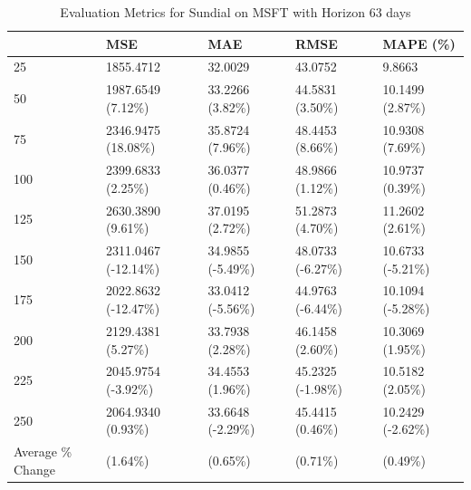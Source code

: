 \begin{table}
\caption{Evaluation Metrics for Sundial on MSFT with Horizon 63 days}
\label{tab:sundial_MSFT_h63_metrics}
\begin{tabular}{lllll}
\toprule
 & MSE & MAE & RMSE & MAPE (\%) \\
\midrule
25 & 1855.4712 & 32.0029 & 43.0752 & 9.8663 \\
50 & 1987.6549 (7.12\%) & 33.2266 (3.82\%) & 44.5831 (3.50\%) & 10.1499 (2.87\%) \\
75 & 2346.9475 (18.08\%) & 35.8724 (7.96\%) & 48.4453 (8.66\%) & 10.9308 (7.69\%) \\
100 & 2399.6833 (2.25\%) & 36.0377 (0.46\%) & 48.9866 (1.12\%) & 10.9737 (0.39\%) \\
125 & 2630.3890 (9.61\%) & 37.0195 (2.72\%) & 51.2873 (4.70\%) & 11.2602 (2.61\%) \\
150 & 2311.0467 (-12.14\%) & 34.9855 (-5.49\%) & 48.0733 (-6.27\%) & 10.6733 (-5.21\%) \\
175 & 2022.8632 (-12.47\%) & 33.0412 (-5.56\%) & 44.9763 (-6.44\%) & 10.1094 (-5.28\%) \\
200 & 2129.4381 (5.27\%) & 33.7938 (2.28\%) & 46.1458 (2.60\%) & 10.3069 (1.95\%) \\
225 & 2045.9754 (-3.92\%) & 34.4553 (1.96\%) & 45.2325 (-1.98\%) & 10.5182 (2.05\%) \\
250 & 2064.9340 (0.93\%) & 33.6648 (-2.29\%) & 45.4415 (0.46\%) & 10.2429 (-2.62\%) \\
Average \% Change & (1.64\%) & (0.65\%) & (0.71\%) & (0.49\%) \\
\bottomrule
\end{tabular}
\end{table}
